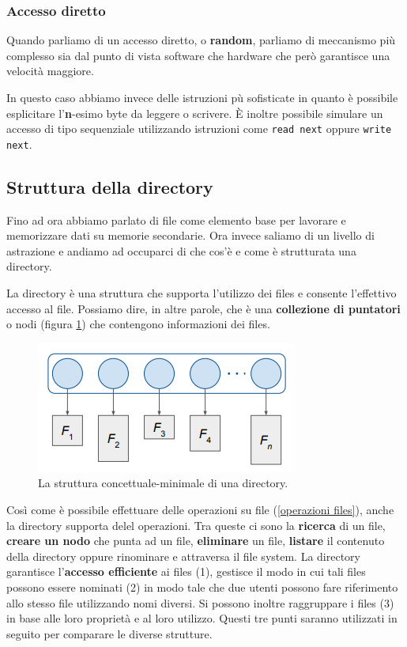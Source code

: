 % 
\subsubsection{Accesso diretto}
Quando parliamo di un accesso diretto, o \textbf{random}, parliamo di meccanismo più complesso sia dal punto di vista software che hardware che però garantisce una velocità maggiore. 

In questo caso abbiamo invece delle istruzioni pù sofisticate in quanto è possibile esplicitare l'\textbf{n}-esimo byte da leggere o scrivere. È inoltre possibile simulare un accesso di tipo sequenziale utilizzando istruzioni come \texttt{read next} oppure \texttt{write next}.

% 
\subsection{Struttura della directory}\label{directory}
Fino ad ora abbiamo parlato di file come elemento base per lavorare e memorizzare dati su memorie secondarie. Ora invece saliamo di un livello di astrazione e andiamo ad occuparci di che cos'è e come è strutturata una directory.

La directory è una struttura che supporta l'utilizzo dei files e  consente l'effettivo accesso al file. Possiamo dire, in altre parole, che è una \textbf{collezione di puntatori} o nodi (figura \ref{fig:struttura directory}) che contengono informazioni dei files.

\begin{figure}[h]
    \centering
    \includegraphics[width =.45\textwidth]{../res/imgs/file system interface/struttura directory.png}
    \caption{La struttura concettuale-minimale di una directory.}
    \label{fig:struttura directory}
\end{figure}

Così come è possibile effettuare delle operazioni su file (\ref{operazioni files}), anche la directory supporta delel operazioni. Tra queste ci sono la \textbf{ricerca} di un file, \textbf{creare un nodo} che punta ad un file, \textbf{eliminare} un file, \textbf{listare} il contenuto della directory oppure rinominare e attraversa il file system. La directory garantisce l'\textbf{accesso efficiente} ai files (1), gestisce il modo in cui tali files possono essere nominati (2) in modo tale che due utenti possono fare riferimento allo stesso file utilizzando nomi diversi. Si possono inoltre raggruppare i files (3) in base alle loro proprietà e al loro utilizzo. Questi tre punti saranno utilizzati in seguito per comparare le diverse strutture.

